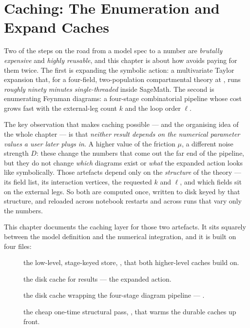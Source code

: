 \chapter{Caching: The Enumeration and Expand Caches}\label{ch:caching}

Two of the steps on the road from a model spec to a number are
\emph{brutally expensive} and \emph{highly reusable}, and this chapter is
about how \Daedalus{} avoids paying for them twice. The first is expanding
the symbolic action: a multivariate Taylor expansion that, for a four-field,
two-population compartmental theory at , runs
\emph{roughly ninety minutes single-threaded} inside SageMath. The second is
enumerating Feynman diagrams: a four-stage combinatorial pipeline whose cost
grows fast with the external-leg count $k$ and the loop order $\ell$.

The key observation that makes caching possible --- and the organising idea
of the whole chapter --- is that \emph{neither result depends on the numerical
parameter values a user later plugs in}. A higher value of the friction
$\mu$, a different noise strength $D$: these change the numbers that come out
the far end of the pipeline, but they do not change \emph{which} diagrams
exist or \emph{what} the expanded action looks like symbolically. Those
artefacts depend only on the \emph{structure} of the theory --- its field
list, its interaction vertices, the requested $k$ and $\ell$, and which fields
sit on the external legs. So both are computed once, written to disk keyed by
that structure, and reloaded across notebook restarts and across runs that
vary only the numbers.

This chapter documents the caching layer for those two artefacts. It sits
squarely between the model definition and the numerical integration, and it is
built on four files:

\begin{description}
  \item[] the low-level, stage-keyed 
        store, , that both higher-level caches build on.
  \item[] the disk cache for
         results --- the expanded action.
  \item[] the disk cache wrapping the four-stage
        diagram pipeline --- .
  \item[] the cheap one-time structural pass,
        , that warms the durable caches up front.
\end{description}

